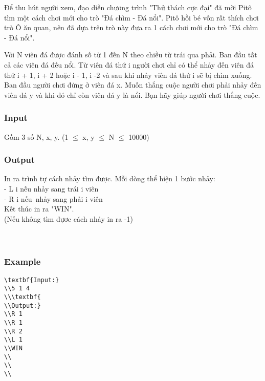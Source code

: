 



   Để thu hút người xem, đạo diễn chương trình "Thử thách cực đại" đã mời Pitô tìm một cách chơi mới cho trò "Đá chìm - Đá nổi". Pitô hồi bé vốn rất thích chơi trò Ô ăn quan, nên đã dựa trên trò này đưa ra 1 cách chơi mới cho trò "Đá chìm - Đá nổi".  

   Với N viên đá được đánh số từ 1 đến N theo chiều từ trái qua phải. Ban đầu tất cả các viên đá đều nổi. Từ viên đá thứ i người chơi chỉ có thể nhảy đến viên đá thứ i + 1, i + 2 hoặc i - 1, i -2 và sau khi nhảy viên đá thứ i sẽ bị chìm xuống. Ban đầu người chơi đứng ở viên đá x. Muốn thắng cuộc người chơi phải nhảy đến viên đá y và khi đó chỉ còn viên đá y là nổi. Bạn hãy giúp người chơi thắng cuộc.  



\subsubsection{   Input  }

   Gồm 3 số N, x, y. (1 $\le$  x, y  $\le$  N  $\le$  10000)  

\subsubsection{   Output  }

   In ra trình tự cách nhảy tìm được. Mỗi dòng thể hiện 1 bước nhảy:   
\\   - L i  nếu nhảy sang trái i viên   
\\   - R i  nếu nhảy sang phải i viên   
\\   Kết thúc in ra "WIN".   
\\   (Nếu không tìm đựơc cách nhảy in ra -1)   
\\
\\
\\

\subsubsection{   Example  }


\begin{verbatim}
\textbf{Input:}
\\5 1 4
\\\textbf{
\\Output:}
\\R 1
\\R 1
\\R 2
\\L 1
\\WIN
\\
\\
\\\end{verbatim}
